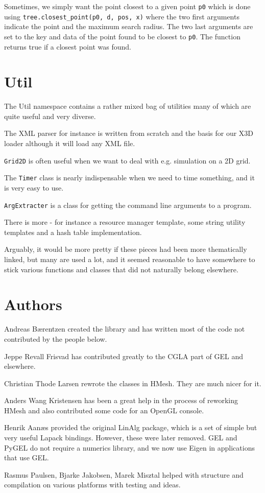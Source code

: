 \documentclass[a4paper]{article}
\begin{document}
Sometimes, we simply want the point closest to a given point \texttt{p0} which is done using \texttt{tree.closest\_point(p0, d, pos, x)} where the two first arguments indicate the point and the maximum search radius. The two last arguments are set to the key and data of the point found to be closest to \texttt{p0}. The function returns true if a closest point was found.
%
%
\section{Util}
%
%
The Util namespace contains a rather mixed bag of utilities many of which are quite useful and very diverse. 
\begin{trivlist}
\item The XML parser for instance is written from scratch and the basis for our X3D loader although it will load any XML file. 
\item \texttt{Grid2D} is often useful when we want to deal with e.g. simulation on a 2D grid. 
\item The \texttt{Timer} class is nearly indispensable when we need to time something, and it is very easy to use. 
\item \texttt{ArgExtracter} is a class for getting the command line arguments to a program. 
\item There is more - for instance a resource manager template, some string utility templates and a hash table implementation.
\end{trivlist}
Arguably, it would be more pretty if these pieces had been more thematically linked, but many are used a lot, and it seemed reasonable to have somewhere to stick various functions and classes that did not naturally belong elsewhere.
%
%
\section{Authors}  
%
%
\begin{trivlist}
\item Andreas B{\ae}rentzen created the library and has written most of the code not contributed by the people below.
\item Jeppe Revall Frisvad has contributed greatly to the CGLA part of GEL and elsewhere.
\item Christian Thode Larsen rewrote the classes in HMesh. They are much nicer for it.
\item Anders Wang Kristensen has been a great help in the process of reworking HMesh and also contributed some code for an OpenGL console.
\item Henrik Aan{\ae}s provided the original LinAlg package, which is a set of simple but very useful Lapack bindings. However, these were later removed. GEL and PyGEL do not require a numerics library, and we now use Eigen in applications that use GEL.
\item Rasmus Paulsen, Bjarke Jakobsen, Marek Misztal helped with structure and compilation on various platforms with testing and ideas.
\end{trivlist}
%
%
%
\end{document}
